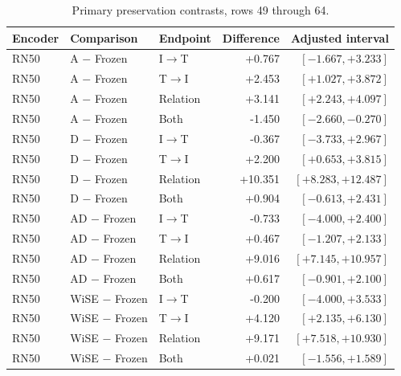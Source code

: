 \begin{table}[t]
\centering
\small
\setlength{\tabcolsep}{3pt}
\begin{tabular}{lllrr}
\toprule
Encoder & Comparison & Endpoint & Difference & Adjusted interval\\
\midrule
RN50 & A $-$ Frozen & I$\to$T & +0.767 & $[-1.667,+3.233]$ \\
RN50 & A $-$ Frozen & T$\to$I & +2.453 & $[+1.027,+3.872]$ \\
RN50 & A $-$ Frozen & Relation & +3.141 & $[+2.243,+4.097]$ \\
RN50 & A $-$ Frozen & Both & -1.450 & $[-2.660,-0.270]$ \\
RN50 & D $-$ Frozen & I$\to$T & -0.367 & $[-3.733,+2.967]$ \\
RN50 & D $-$ Frozen & T$\to$I & +2.200 & $[+0.653,+3.815]$ \\
RN50 & D $-$ Frozen & Relation & +10.351 & $[+8.283,+12.487]$ \\
RN50 & D $-$ Frozen & Both & +0.904 & $[-0.613,+2.431]$ \\
RN50 & AD $-$ Frozen & I$\to$T & -0.733 & $[-4.000,+2.400]$ \\
RN50 & AD $-$ Frozen & T$\to$I & +0.467 & $[-1.207,+2.133]$ \\
RN50 & AD $-$ Frozen & Relation & +9.016 & $[+7.145,+10.957]$ \\
RN50 & AD $-$ Frozen & Both & +0.617 & $[-0.901,+2.100]$ \\
RN50 & WiSE $-$ Frozen & I$\to$T & -0.200 & $[-4.000,+3.533]$ \\
RN50 & WiSE $-$ Frozen & T$\to$I & +4.120 & $[+2.135,+6.130]$ \\
RN50 & WiSE $-$ Frozen & Relation & +9.171 & $[+7.518,+10.930]$ \\
RN50 & WiSE $-$ Frozen & Both & +0.021 & $[-1.556,+1.589]$ \\
\bottomrule
\end{tabular}
\caption{Primary preservation contrasts, rows 49 through 64.}\label{tab:adprimary48}
\end{table}


